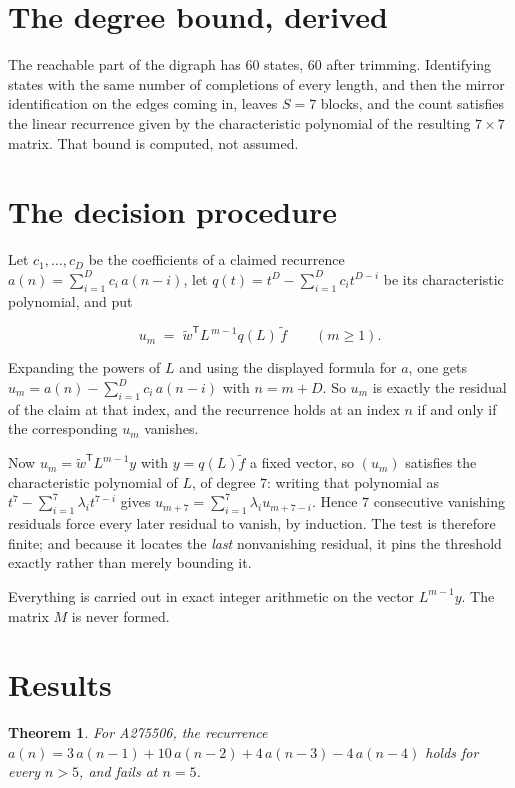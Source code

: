 \documentclass[11pt]{article}
\newtheorem{theorem}{Theorem}
\theoremstyle{definition}
\begin{document}
\section{The degree bound, derived}

The reachable part of the digraph has $60$ states, $60$ after trimming. Identifying states with the same number of completions of every length, and then the mirror identification on the edges coming in, leaves $S = 7$ blocks, and the count satisfies the linear recurrence given by the characteristic polynomial of the resulting $7\times7$ matrix. That bound is computed, not assumed.

\section{The decision procedure}

Let $c_1,\dots,c_D$ be the coefficients of a claimed recurrence $a(n) = \sum_{i=1}^{D} c_i\,a(n-i)$, let $q(t) = t^{D} - \sum_{i=1}^{D} c_i t^{D-i}$ be its characteristic polynomial, and put

\[u_m \;=\; \tilde w^{\mathsf T} L^{\,m-1} q(L)\,\tilde f \qquad (m \ge 1).\]

Expanding the powers of $L$ and using the displayed formula for $a$, one gets $u_m = a(n) - \sum_{i=1}^{D} c_i\,a(n-i)$ with $n = m + D$. So $u_m$ is exactly the residual of the claim at that index, and the recurrence holds at an index $n$ if and only if the corresponding $u_m$ vanishes.

Now $u_m = \tilde w^{\mathsf T} L^{m-1} y$ with $y = q(L)\tilde f$ a fixed vector, so $(u_m)$ satisfies the characteristic polynomial of $L$, of degree $7$: writing that polynomial as $t^{7} - \sum_{i=1}^{7} \lambda_i t^{7-i}$ gives $u_{m+7} = \sum_{i=1}^{7} \lambda_i u_{m+7-i}$. Hence $7$ consecutive vanishing residuals force every later residual to vanish, by induction. The test is therefore finite; and because it locates the {\itshape last} nonvanishing residual, it pins the threshold exactly rather than merely bounding it.

Everything is carried out in exact integer arithmetic on the vector $L^{m-1}y$. The matrix $M$ is never formed.

\section{Results}

\begin{theorem} For A275506, the recurrence $a(n) = 3\,a(n-1) + 10\,a(n-2) + 4\,a(n-3) - 4\,a(n-4)$ holds for every $n > 5$, and fails at $n = 5$.\end{theorem}
\end{document}
